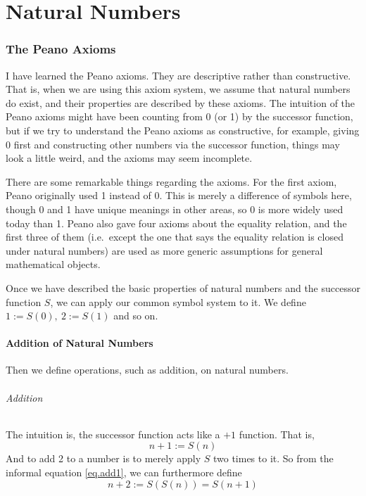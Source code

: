 
\part{Natural Numbers}
\section{The Peano Axioms}
I have learned the Peano axioms. They are descriptive rather than constructive. That is, when we are 
using this axiom system, we assume that natural numbers do exist, and their properties are described by 
these axioms. The intuition of the Peano axioms might have been counting from 0 (or 1) by the successor 
function, but if we try to understand the Peano axioms as constructive, for example, giving 0 first and 
constructing other numbers via the successor function, things may look a little weird, and the axioms 
may seem incomplete.

There are some remarkable things regarding the axioms. For the first axiom, Peano originally used 1 
instead of 0. This is merely a difference of symbols here, though 0 and 1 have unique meanings in other 
areas, so 0 is more widely used today than 1. Peano also gave four axioms about the equality relation, 
and the first three of them (i.e.~except the one that says the equality relation is closed under 
natural numbers) are used as more generic assumptions for general mathematical objects.

Once we have described the basic properties of natural numbers and the successor function $S$, we can 
apply our common symbol system to it. We define $1 := S(0),\ 2 :=S(1)$ and so on.

\subsection{Addition of Natural Numbers}
Then we define operations, such as addition, on natural numbers. 

\paragraph{Addition}
The intuition is, the successor function acts like a $+1$ function. That is, 
\begin{equation}
n+1 := S(n) \label{eq.add1}
\end{equation}
And to add 2 to a number is to merely apply $S$ two times to it. So from the informal equation 
\ref{eq.add1}, we can furthermore define 
\begin{equation}
n+2 := S(S(n)) = S(n+1) \label{eq.add2}
\end{equation}

